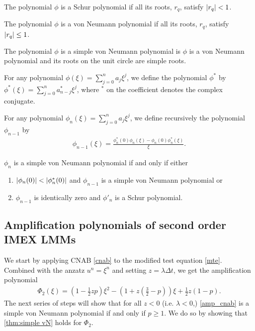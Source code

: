 \begin{definition}
	The polynomial $\phi$ is a Schur polynomial if all its roots, $r_q$, satisfy $\left|r_q\right| < 1$.
\end{definition}
\begin{definition}
        The polynomial $\phi$ is a von Neumann polynomial if all its roots, $r_q$, satisfy $\left|r_q\right|\leq 1$.
\end{definition}
\begin{definition}
	The polynomial $\phi$ is a simple von Neumann polynomial is $\phi$ is a von Neumann polynomial and its roots on the unit circle are simple roots.
\end{definition}
\begin{definition}
	For any polynomial $\phi(\xi) = \sum^n_{j=0} a_j\xi^j$, we define the polynomial $\phi^*$ by $\phi^*(\xi) = \sum^n_{j=0} a^*_{n-j} \xi^j$, where $^*$ on the coefficient denotes the complex conjugate.
\label{defn:conj}
\end{definition}
\begin{definition}
	For any polynomial $\phi_n(\xi) = \sum^n_{j=0} a_j\xi^j$, we define recursively the polynomial $\phi_{n-1}$ by
	\begin{align}
	\phi_{n-1}(\xi) = \frac{\phi_n^*(0)\phi_n(\xi) - \phi_n(0)\phi_n^*(\xi)}{\xi}.
	\end{align} 
\label{defn:recurse}
\end{definition}
\begin{theorem}
	$\phi_n$ is a simple von Neumann polynomial if and only if either 
	\begin{enumerate}[label=(\alph{*})]
		\item $\left|\phi_n(0)\right| < \left|\phi^*_n(0)\right|$ and $\phi_{n-1}$ is a simple von Neumann polynomial or
		
		\item $\phi_{n-1}$ is identically zero and $\phi'_{n}$ is a Schur polynomial.
	\end{enumerate}
\label{thm:simple vN}
\end{theorem}

\subsection{Amplification polynomials of second order IMEX LMMs}
We start by applying CNAB \eqref{cnab} to the modified test equation \eqref{mte}. Combined with the anzatz $u^n = \xi^n$ and setting $z=\lambda\Delta t$, we get the amplification polynomial
\begin{align}
\Phi_2(\xi) 
= \left(1 - \frac{1}{2}zp\right)\xi^2
- \left(1 + z\left(\frac{3}{2}-p \right)\right)\xi + \frac{1}{2}z(1-p).
\label{amp_cnab}
\end{align}
The next series of steps will show that for all $z<0$ (i.e. $\lambda < 0$,) \eqref{amp_cnab} is a simple von Neumann polynomial if and only if $p\geq 1$. We do so by showing that \cref{thm:simple vN} holds for $\Phi_2$.

